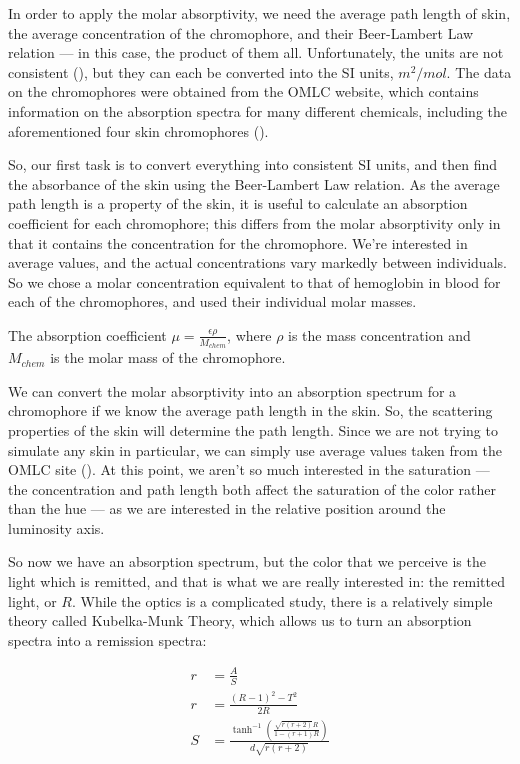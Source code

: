 In order to apply the molar absorptivity, we need the average path length of skin, the average concentration of the chromophore, and their Beer-Lambert Law relation --- in this case, the product of them all. Unfortunately, the units are not consistent (\cite{Clark2007}), but they can each be converted into the SI units, $m^{2}/mol$. The data on the chromophores were obtained from the OMLC website, which contains information on the absorption spectra for many different chemicals, including the aforementioned four skin chromophores (\cite{OMLC2001}). 

So, our first task is to convert everything into consistent SI units, and then find the absorbance of the skin using the Beer-Lambert Law relation. As the average path length is a property of the skin, it is useful to calculate an absorption coefficient for each chromophore; this differs from the molar absorptivity only in that it contains the concentration for the chromophore. We're interested in average values, and the actual concentrations vary markedly between individuals. So we chose a molar concentration equivalent to that of hemoglobin in blood for each of the chromophores, and used their individual molar masses.

The absorption coefficient $\mu = \frac{\epsilon \rho}{M_{chem}}$, where $\rho$ is the mass concentration and $M_{chem}$ is the molar mass of the chromophore.

We can convert the molar absorptivity into an absorption spectrum for a chromophore if we know the average path length in the skin. So, the scattering properties of the skin will determine the path length. Since we are not trying to simulate any skin in particular, we can simply use average values taken from the OMLC site (\cite{OMLC2001}). At this point, we aren't so much interested in the saturation --- the concentration and path length both affect the saturation of the color rather than the hue --- as we are interested in the relative position around the luminosity axis.

So now we have an absorption spectrum, but the color that we perceive is the light which is remitted, and that is what we are really interested in: the remitted light, or $R$. While the optics is a complicated study, there is a relatively simple theory called Kubelka-Munk Theory, which allows us to turn an absorption spectra into a remission spectra:

\begin{align}\label{eq:KubelkaMunk}
r &=\frac{A}{S} \\
r & =\frac{(R-1)^2-T^2}{2 R} \\
S & =\frac{\tanh ^{-1}\left(\frac{\sqrt{r (r+2)} R}{1-(r+1) R}\right)}{d \sqrt{r (r+2)}}
\end{align}

